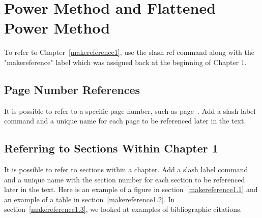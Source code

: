 
\cleardoublepage


\chapter{Power Method and Flattened Power Method}
\label{makereference2}

To refer to Chapter~\ref{makereference1}, use the slash ref command
along with the "makereference" label which was assigned back at the
beginning of Chapter 1.

\section{Page Number References}
\label{makereference2.1} It is possible to refer to a specific page
number, such as page~\pageref{makereference1}.  Add a slash label
command and a unique name for each page to be referenced later in
the text.

\section{Referring to Sections Within Chapter 1}
\label{makereference2.2} It is possible to refer to sections within
a chapter.  Add a slash label command and a unique name with the
section number for each section to be referenced later in the text.
Here is an example of a figure in section~\ref{makereference1.1} and
an example of a table in section~\ref{makereference1.2}.  In
section~\ref{makereference1.3}, we looked at examples of
bibliographic citations.
